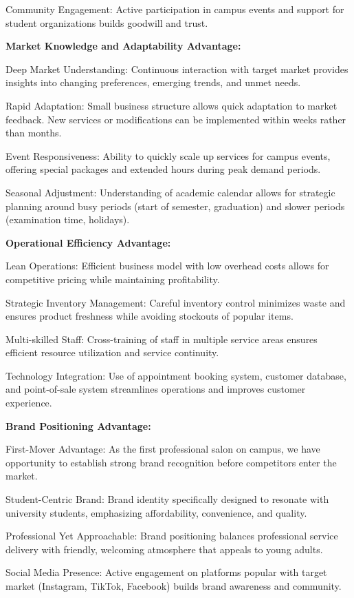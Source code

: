 \documentclass[a4paper,12pt]{article}
\begin{document}
Community Engagement: Active participation in campus events and support for student organizations builds goodwill and trust.

\textbf{Market Knowledge and Adaptability Advantage:}

Deep Market Understanding: Continuous interaction with target market provides insights into changing preferences, emerging trends, and unmet needs.

Rapid Adaptation: Small business structure allows quick adaptation to market feedback. New services or modifications can be implemented within weeks rather than months.

Event Responsiveness: Ability to quickly scale up services for campus events, offering special packages and extended hours during peak demand periods.

Seasonal Adjustment: Understanding of academic calendar allows for strategic planning around busy periods (start of semester, graduation) and slower periods (examination time, holidays).

\textbf{Operational Efficiency Advantage:}

Lean Operations: Efficient business model with low overhead costs allows for competitive pricing while maintaining profitability.

Strategic Inventory Management: Careful inventory control minimizes waste and ensures product freshness while avoiding stockouts of popular items.

Multi-skilled Staff: Cross-training of staff in multiple service areas ensures efficient resource utilization and service continuity.

Technology Integration: Use of appointment booking system, customer database, and point-of-sale system streamlines operations and improves customer experience.

\textbf{Brand Positioning Advantage:}

First-Mover Advantage: As the first professional salon on campus, we have opportunity to establish strong brand recognition before competitors enter the market.

Student-Centric Brand: Brand identity specifically designed to resonate with university students, emphasizing affordability, convenience, and quality.

Professional Yet Approachable: Brand positioning balances professional service delivery with friendly, welcoming atmosphere that appeals to young adults.

Social Media Presence: Active engagement on platforms popular with target market (Instagram, TikTok, Facebook) builds brand awareness and community.
\end{document}
